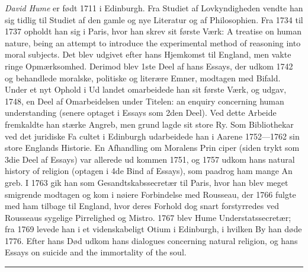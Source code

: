\documentclass[12pt,a4paper]{book}
\newcommand{\divrule}{\begin{center}\rule{2cm}{0.4pt}\end{center}}
\begin{document}
\emph{David Hume} er født 1711 i Edinburgh. Fra Studiet
af Lovkyndigheden vendte han sig tidlig til Studiet af den
gamle og nye Literatur og af Philosophien. Fra 1734 til 1737
opholdt han sig i Paris, hvor han skrev sit første Værk:
A treatise on human nature, being an attempt to introduce
the experimental method of reasoning into moral subjects.
Det blev udgivet efter hans Hjemkomst til England, men vakte
ringe Opmærksomhed. Derimod blev 1ste Deel af hans Essays,
der udkom 1742 og behandlede moralske, politiske og literære
Emner, modtagen med Bifald. Under et nyt Ophold i Ud\-%
landet omarbeidede han sit første Værk, og udgav, 1748, en
Deel af Omarbeidelsen under Titelen: an enquiry concerning
human understanding (senere optaget i Essays som 2den Deel).
Ved dette Arbeide fremkaldte han stærke Angreb, men grund\-%
lagde sit store Ry. Som Bibliothekar ved det juridiske Fa\-%
cultet i Edinburgh udarbeidede han i Aarene 1752---1762 sin
store Englands Historie. En Afhandling om Moralens Prin\-%
ciper (siden trykt som 3die Deel af Essays) var allerede ud\-%
kommen 1751, og 1757 udkom hans natural history of religion
(optagen i 4de Bind af Essays), som paadrog ham mange An\-%
greb. I 1763 gik han som Gesandtskabssecretær til Paris,
hvor han blev meget smigrende modtagen og kom i nøiere
Forbindelse med Rousseau, der 1766 fulgte med ham tilbage
til England, hvor deres Forhold dog snart forstyrredes ved
Rousseaus sygelige Pirrelighed og Mistro. 1767 blev Hume
Understatssecretær; fra 1769 levede han i et videnskabeligt
Otium i Edinburgh, i hvilken By han døde 1776. Efter hans
Død udkom hans dialogues concerning natural religion, og
hans Essays on suicide and the immortality of the soul.

\divrule
\end{document}
